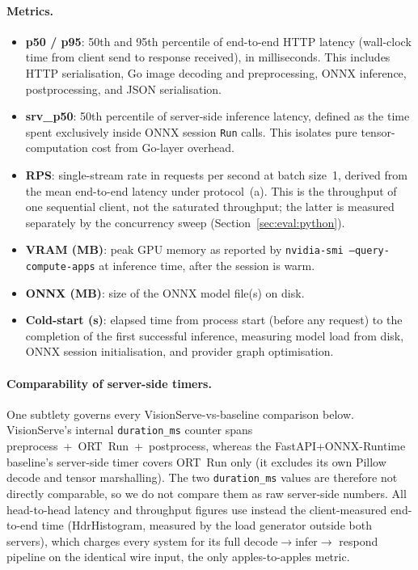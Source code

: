 \paragraph{Metrics.}
\begin{itemize}
  \item \textbf{p50 / p95}: 50th and 95th percentile of end-to-end HTTP
    latency (wall-clock time from client send to response received), in milliseconds.
    This includes HTTP serialisation, Go image decoding and preprocessing, ONNX
    inference, postprocessing, and JSON serialisation.
  \item \textbf{srv\_p50}: 50th percentile of server-side inference latency,
    defined as the time spent exclusively inside ONNX session \texttt{Run} calls.
    This isolates pure tensor-computation cost from Go-layer overhead.
  \item \textbf{RPS}: single-stream rate in requests per second at batch
    size~1, derived from the mean end-to-end latency under protocol~(a).  This is the
    throughput of one sequential client, not the saturated throughput; the
    latter is measured separately by the concurrency sweep
    (Section~\ref{sec:eval:python}).
  \item \textbf{VRAM (MB)}: peak GPU memory as reported by \texttt{nvidia-smi
    --query-compute-apps} at inference time, after the session is warm.
  \item \textbf{ONNX (MB)}: size of the ONNX model file(s) on disk.
  \item \textbf{Cold-start (s)}: elapsed time from process start (before any request)
    to the completion of the first successful inference, measuring model load from disk,
    ONNX session initialisation, and provider graph optimisation.
\end{itemize}

\paragraph{Comparability of server-side timers.}
One subtlety governs every VisionServe-vs-baseline comparison below.  VisionServe's
internal \texttt{duration\_ms} counter spans preprocess~+~ORT~Run~+~postprocess, whereas
the FastAPI+ONNX-Runtime baseline's server-side timer covers ORT~Run only (it excludes
its own Pillow decode and tensor marshalling).  The two \texttt{duration\_ms} values are
therefore not directly comparable, so we do not compare them as raw server-side
numbers.  All head-to-head latency and throughput figures use instead the
client-measured end-to-end time (HdrHistogram, measured by the load generator
outside both servers), which charges every system for its full decode$\to$infer$\to$
respond pipeline on the identical wire input, the only apples-to-apples metric.

